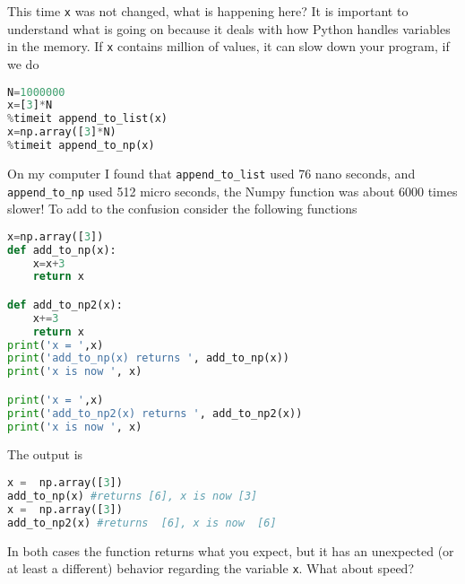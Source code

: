 \documentclass[graybox,sectrefs,envcountresetchap,open=right,final]{svmonodo}
\begin{document}
This time \texttt{x} was not changed, what is happening here? It is important to understand what is going on because it deals with how Python handles variables in the memory. If \texttt{x} contains million of values, it can slow down your program, if we do






\begin{lstlisting}[language=python,style=blue1bar]
N=1000000
x=[3]*N
%timeit append_to_list(x)
x=np.array([3]*N)
%timeit append_to_np(x)

\end{lstlisting}

On my computer I found that \Verb!append_to_list! used 76 nano seconds, and \Verb!append_to_np!
used 512 micro seconds, the Numpy function was about 6000 times slower! To add to the confusion consider the following functions
















\begin{lstlisting}[language=python,style=blue1bar]
x=np.array([3])
def add_to_np(x):
    x=x+3
    return x

def add_to_np2(x):
    x+=3
    return x
print('x = ',x)
print('add_to_np(x) returns ', add_to_np(x))
print('x is now ', x)

print('x = ',x)
print('add_to_np2(x) returns ', add_to_np2(x))
print('x is now ', x)

\end{lstlisting}

The output is





\begin{lstlisting}[language=python,style=blue1bar]
x =  np.array([3])
add_to_np(x) #returns [6], x is now [3] 
x =  np.array([3])
add_to_np2(x) #returns  [6], x is now  [6]

\end{lstlisting}

In both cases the function returns what you expect, but it has an unexpected (or at least a different) behavior regarding the variable \texttt{x}. What about speed?
\end{document}
